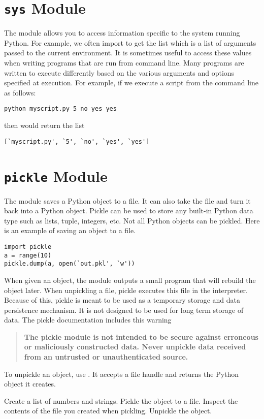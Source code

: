 \section*{\texttt{sys} Module}
The  module allows you to access information specific to the system running Python.
For example, we often import  to get the list  which is a list of arguments passed to the current environment.
It is sometimes useful to access these values when writing programs that are run from command line.
Many programs are written to execute differently based on the various arguments and options specified at execution.
For example, if we execute a script from the command line as follows:
\begin{verbatim}
python myscript.py 5 no yes yes
\end{verbatim}
then  would return the list
\begin{verbatim}
[`myscript.py', `5', `no', `yes', `yes']
\end{verbatim}

\section*{\texttt{pickle} Module}
The  module saves a Python object to a file.
It can also take the file and turn it back into a Python object.
Pickle can be used to store any built-in Python data type such as lists, tuple, integers, etc.
Not all Python objects can be pickled.
Here is an example of saving an object to a file.
\begin{lstlisting}
import pickle
a = range(10)
pickle.dump(a, open(`out.pkl', `w'))
\end{lstlisting}
When given an object, the  module outputs a small program that will rebuild the object later.
When unpickling a file, pickle executes this file in the interpreter.
Because of this, pickle is meant to be used as a temporary storage and data persistence mechanism.
It is not designed to be used for long term storage of data.
The pickle documentation includes this warning
\begin{quote}
\textbf{The pickle module is not intended to be secure against erroneous or maliciously constructed data.
Never unpickle data received from an untrusted or unauthenticated source.}
\end{quote}
To unpickle an object, use .
It accepts a file handle and returns the Python object it creates.

\begin{problem}
Create a list of numbers and strings.
Pickle the object to a file.
Inspect the contents of the file you created when pickling.
Unpickle the object.
\end{problem}

